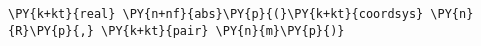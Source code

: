 \begin{Verbatim}[commandchars=\\\{\}]
    \PY{k+kt}{real} \PY{n+nf}{abs}\PY{p}{(}\PY{k+kt}{coordsys} \PY{n}{R}\PY{p}{,} \PY{k+kt}{pair} \PY{n}{m}\PY{p}{)}
\end{Verbatim}
